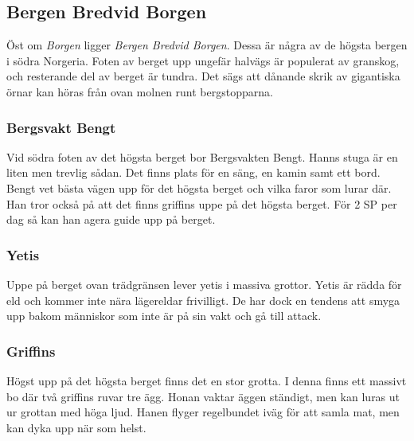\subsection{Bergen Bredvid Borgen}
\label{bergenBredvidBorgen}
Öst om \textit{Borgen} ligger \textit{Bergen Bredvid Borgen}. Dessa är några av de högsta bergen i södra Norgeria. Foten av berget upp ungefär halvägs är populerat av granskog, och resterande del av berget är tundra. Det sägs att dånande skrik av gigantiska örnar kan höras från ovan molnen runt bergstopparna.

\subsubsection{Bergsvakt Bengt}
Vid södra foten av det högsta berget bor Bergsvakten Bengt. Hanns stuga är en liten men trevlig sådan. Det finns plats för en säng, en kamin samt ett bord. Bengt vet bästa vägen upp för det högsta berget och vilka faror som lurar där. Han tror också på att det finns griffins uppe på det högsta berget. För 2 SP per dag så kan han agera guide upp på berget.

\subsubsection{Yetis}
Uppe på berget ovan trädgränsen lever yetis i massiva grottor. Yetis är rädda för eld och kommer inte nära lägereldar frivilligt. De har dock en tendens att smyga upp bakom människor som inte är på sin vakt och gå till attack.

\subsubsection{Griffins}
Högst upp på det högsta berget finns det en stor grotta. I denna finns ett massivt bo där två griffins ruvar tre ägg. Honan vaktar äggen ständigt, men kan luras ut ur grottan med höga ljud. Hanen flyger regelbundet iväg för att samla mat, men kan dyka upp när som helst.